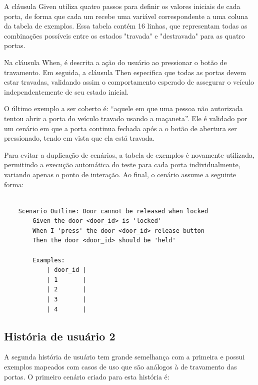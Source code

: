 A cláusula Given utiliza quatro passos para definir os valores iniciais de cada porta, de forma que cada um recebe uma variável correspondente a uma coluna da 
tabela de exemplos. Essa tabela contém 16 linhas, que representam todas as combinações possíveis entre os estados "travada" e "destravada" para as quatro portas.

Na cláusula When, é descrita a ação do usuário ao pressionar o botão de travamento. Em seguida, a cláusula Then especifica que todas as portas devem estar travadas, 
validando assim o comportamento esperado de assegurar o veículo independentemente de seu estado inicial.

O último exemplo a ser coberto é: “aquele em que uma pessoa não autorizada tentou abrir a porta do veículo travado usando a maçaneta”. Ele é validado por um 
cenário em que a porta continua fechada após a o botão de abertura ser pressionado, tendo em vista que ela está travada.

Para evitar a duplicação de cenários, a tabela de exemplos é novamente utilizada, permitindo a execução automática do teste para cada porta individualmente, variando 
apenas o ponto de interação. Ao final, o cenário assume a seguinte forma:

\begin{verbatim}

    Scenario Outline: Door cannot be released when locked
        Given the door <door_id> is 'locked'
        When I 'press' the door <door_id> release button
        Then the door <door_id> should be 'held'

        Examples:
            | door_id |
            | 1       |
            | 2       |
            | 3       |
            | 4       |

\end{verbatim}


\subsection{História de usuário 2}

A segunda história de usuário tem grande semelhança com a primeira e possui exemplos mapeados com casos de uso que são análogos à de travamento das portas. O 
primeiro cenário criado para esta história é:

